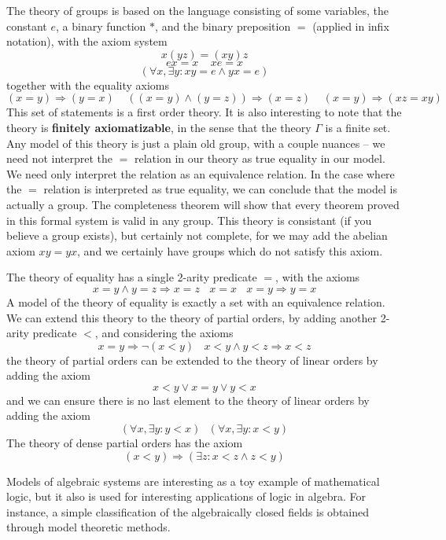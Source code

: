 \begin{example}
    The theory of groups is based on the language consisting of some variables, the constant $e$, a binary function $*$, and the binary preposition $=$ (applied in infix notation), with the axiom system
    \[ x(yz) = (xy)z \]
    \[ ex = x\ \ \ \ \ xe = x \]
    \[ (\forall x, \exists y: xy = e \wedge yx = e) \]
    together with the equality axioms
    \[ (x = y) \Rightarrow (y = x)\ \ \ \ \ ((x = y) \wedge (y = z)) \Rightarrow (x = z)\ \ \ \ \ (x = y) \Rightarrow (xz = xy) \]
    This set of statements is a first order theory. It is also interesting to note that the theory is {\bf finitely axiomatizable}, in the sense that the theory $\Gamma$ is a finite set. Any model of this theory is just a plain old group, with a couple nuances -- we need not interpret the $=$ relation in our theory as true equality in our model. We need only interpret the relation as an equivalence relation. In the case where the $=$ relation is interpreted as true equality, we can conclude that the model is actually a group. The completeness theorem will show that every theorem proved in this formal system is valid in any group. This theory is consistant (if you believe a group exists), but certainly not complete, for we may add the abelian axiom $xy = yx$, and we certainly have groups which do not satisfy this axiom.
\end{example}

\begin{example}
    The theory of equality has a single 2-arity predicate $=$, with the axioms
    \[ x = y \wedge y = z \Rightarrow x = z\ \ \ \ x = x\ \ \ \ x = y \Rightarrow y = x \]
    A model of the theory of equality is exactly a set with an equivalence relation. We can extend this theory to the theory of partial orders, by adding another 2-arity predicate $<$, and considering the axioms
    \[ x = y \Rightarrow \neg (x < y)\ \ \ \ x < y \wedge y < z \Rightarrow x < z \]
    the theory of partial orders can be extended to the theory of linear orders by adding the axiom
    \[ x < y \vee x = y \vee y < x \]
    and we can ensure there is no last element to the theory of linear orders by adding the axiom
    \[ (\forall x, \exists y: y < x)\ \ \ (\forall x, \exists y: x < y) \]
    The theory of dense partial orders has the axiom
    \[ (x < y) \Rightarrow (\exists z: x < z \wedge z < y) \]
\end{example}

Models of algebraic systems are interesting as a toy example of mathematical logic, but it also is used for interesting applications of logic in algebra. For instance, a simple classification of the algebraically closed fields is obtained through model theoretic methods.

